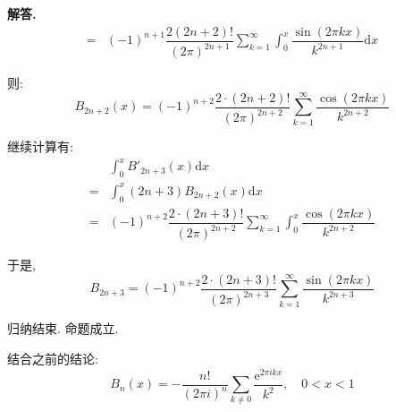 \documentclass[12pt, a4paper, oneside]{ctexart}
\newenvironment{solution}{\par\noindent\textbf{解答. }}{\par}
\begin{document}
\begin{solution}
$$\begin{aligned}
=&(-1)^{n+1}\dfrac{2(2n+2)!}{(2\pi)^{2n+1}}\sum_{k=1}^{\infty}\int_{0}^{x}\dfrac{\sin(2\pi kx)}{k^{2n+1}}\mathrm{d}x
\end{aligned}
$$
\par
则:
$$
B_{2n+2}(x)=(-1)^{n+2}\dfrac{2\cdot (2n+2)!}{(2\pi)^{2n+2}}\sum_{k=1}^{\infty}\dfrac{\cos(2\pi kx)}{k^{2n+2}}
$$
\par
继续计算有:
$$
\begin{aligned}
&\int_{0}^{x}B'_{2n+3}(x)\mathrm{d}x\\
=&\int_{0}^{x}(2n+3)B_{2n+2}(x)\mathrm{d}x\\
=&(-1)^{n+2}\dfrac{2\cdot (2n+3)!}{(2\pi)^{2n+2}}\sum_{k=1}^{\infty}\int_{0}^{x}\dfrac{\cos(2\pi kx)}{k^{2n+2}}
\end{aligned}
$$
\par
于是,
$$
B_{2n+3}=(-1)^{n+2}\dfrac{2\cdot (2n+3)!}{(2\pi)^{2n+3}}\sum_{k=1}^{\infty}\dfrac{\sin(2\pi kx)}{k^{2n+3}}
$$
\par
归纳结束. 命题成立.
\par
结合之前的结论:
$$
B_n(x)=-\dfrac{n!}{(2\pi i)^n}\sum_{k \ne 0}\dfrac{\mathrm{e}^{2\pi ikx}}{k^2},\quad 0<x<1
$$
\end{solution}
\end{document}
